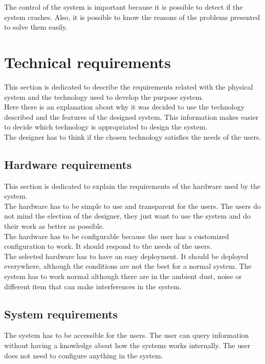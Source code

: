 The control of the system is important because it is possible to detect if the system crashes. Also, it is possible to know the reasons of the problems presented to solve them easily.

\section{Technical requirements}

This section is dedicated to describe the requirements related with the physical system and the technology used to develop the purpose system.\\

Here there is an explanation about why it was decided to use the technology described and the features of the designed system. This information makes easier to decide which technology is appropriated to design the system.\\

The designer has to think if the chosen technology satisfies the needs of the users.

\subsection{Hardware requirements}

This section is dedicated to explain the requirements of the hardware used by the system.\\

The hardware has to be simple to use and transparent for the users. The users do not mind the election of the designer, they just want to use the system and do their work as better as possible.\\

The hardware has to be configurable because the user has a customized configuration to work. It should respond to the needs of the users.\\

The selected hardware has to have an easy deployment. It should be deployed everywhere, although the conditions are not the best for a normal system. The system has to work normal although there are in the ambient dust, noise or different item that can make interferences in the system.

\subsection{System requirements}

The system has to be accessible for the users. The user can query information without having a knowledge about how the systems works internally. The user does not need to configure anything in the system.\\

